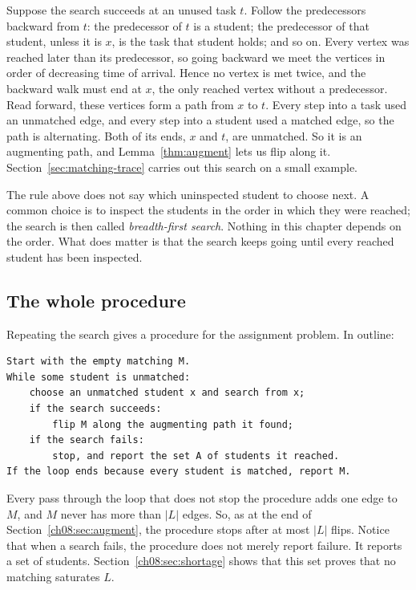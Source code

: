 Suppose the search succeeds at an unused task $t$. Follow the predecessors backward from $t$: the predecessor of $t$ is a student; the predecessor of that student, unless it is $x$, is the task that student holds; and so on. Every vertex was reached later than its predecessor, so going backward we meet the vertices in order of decreasing time of arrival. Hence no vertex is met twice, and the backward walk must end at $x$, the only reached vertex without a predecessor. Read forward, these vertices form a path from $x$ to $t$. Every step into a task used an unmatched edge, and every step into a student used a matched edge, so the path is alternating. Both of its ends, $x$ and $t$, are unmatched. So it is an augmenting path, and Lemma~\ref{thm:augment} lets us flip along it. Section~\ref{sec:matching-trace} carries out this search on a small example.

The rule above does not say which uninspected student to choose next. A common choice is to inspect the students in the order in which they were reached; the search is then called \emph{breadth-first search}. Nothing in this chapter depends on the order. What does matter is that the search keeps going until every reached student has been inspected.

\subsection*{The whole procedure}
Repeating the search gives a procedure for the assignment problem. In outline:
\par\noindent\begin{minipage}{\linewidth}
\begin{lstlisting}
Start with the empty matching M.
While some student is unmatched:
    choose an unmatched student x and search from x;
    if the search succeeds:
        flip M along the augmenting path it found;
    if the search fails:
        stop, and report the set A of students it reached.
If the loop ends because every student is matched, report M.
\end{lstlisting}
\end{minipage}\par
Every pass through the loop that does not stop the procedure adds one edge to $M$, and $M$ never has more than $|L|$ edges. So, as at the end of Section~\ref{ch08:sec:augment}, the procedure stops after at most $|L|$ flips. Notice that when a search fails, the procedure does not merely report failure. It reports a set of students. Section~\ref{ch08:sec:shortage} shows that this set proves that no matching saturates $L$.

